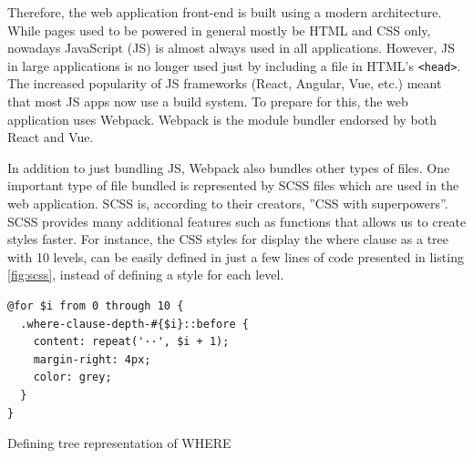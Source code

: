 Therefore, the web application front-end is built using a modern architecture. While pages used to be powered in general mostly be HTML and CSS only, nowadays JavaScript (JS) is almost always used in all applications. However, JS in large applications is no longer used just by including a file in HTML's \texttt{<head>}. The increased popularity of JS frameworks (React, Angular, Vue, etc.) meant that most JS apps now use a build system. To prepare for this, the web application uses Webpack.  Webpack is the  module bundler endorsed by both React and Vue.

In addition to just bundling JS, Webpack also bundles other types of files. One important type of file bundled is represented by SCSS files which are used in the web application. SCSS is, according to their creators, ''CSS with superpowers''. SCSS provides many additional features such as functions that allows us to create styles faster. For instance, the CSS styles for display the where clause as a tree with 10 levels, can be easily defined in just a few lines of code presented in listing \ref{fig:scss}, instead of defining a style for each level.

\begin{code}
\begin{verbatim}
@for $i from 0 through 10 {
  .where-clause-depth-#{$i}::before {
    content: repeat('··', $i + 1);
    margin-right: 4px;
    color: grey;
  }
}
\end{verbatim}
\caption{Defining tree representation of WHERE}
\label{fig:scss}
\end{code}


